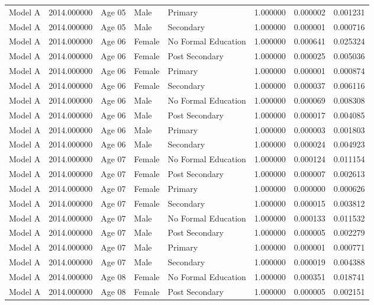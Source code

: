 \begin{table}[ht]
\begin{tabular}{lrlllrrr}
Model A & 2014.000000 & Age 05 & Male & Primary & 1.000000 & 0.000002 & 0.001231 \\
Model A & 2014.000000 & Age 05 & Male & Secondary & 1.000000 & 0.000001 & 0.000716 \\
Model A & 2014.000000 & Age 06 & Female & No Formal Education & 1.000000 & 0.000641 & 0.025324 \\
Model A & 2014.000000 & Age 06 & Female & Post Secondary & 1.000000 & 0.000025 & 0.005036 \\
Model A & 2014.000000 & Age 06 & Female & Primary & 1.000000 & 0.000001 & 0.000874 \\
Model A & 2014.000000 & Age 06 & Female & Secondary & 1.000000 & 0.000037 & 0.006116 \\
Model A & 2014.000000 & Age 06 & Male & No Formal Education & 1.000000 & 0.000069 & 0.008308 \\
Model A & 2014.000000 & Age 06 & Male & Post Secondary & 1.000000 & 0.000017 & 0.004085 \\
Model A & 2014.000000 & Age 06 & Male & Primary & 1.000000 & 0.000003 & 0.001803 \\
Model A & 2014.000000 & Age 06 & Male & Secondary & 1.000000 & 0.000024 & 0.004923 \\
Model A & 2014.000000 & Age 07 & Female & No Formal Education & 1.000000 & 0.000124 & 0.011154 \\
Model A & 2014.000000 & Age 07 & Female & Post Secondary & 1.000000 & 0.000007 & 0.002613 \\
Model A & 2014.000000 & Age 07 & Female & Primary & 1.000000 & 0.000000 & 0.000626 \\
Model A & 2014.000000 & Age 07 & Female & Secondary & 1.000000 & 0.000015 & 0.003812 \\
Model A & 2014.000000 & Age 07 & Male & No Formal Education & 1.000000 & 0.000133 & 0.011532 \\
Model A & 2014.000000 & Age 07 & Male & Post Secondary & 1.000000 & 0.000005 & 0.002279 \\
Model A & 2014.000000 & Age 07 & Male & Primary & 1.000000 & 0.000001 & 0.000771 \\
Model A & 2014.000000 & Age 07 & Male & Secondary & 1.000000 & 0.000019 & 0.004388 \\
Model A & 2014.000000 & Age 08 & Female & No Formal Education & 1.000000 & 0.000351 & 0.018741 \\
Model A & 2014.000000 & Age 08 & Female & Post Secondary & 1.000000 & 0.000005 & 0.002151 \\

\end{tabular}
\end{table}
